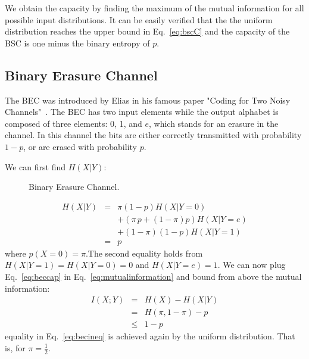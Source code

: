 We obtain the capacity by finding the maximum of the mutual information for all possible input distributions. It can be easily verified that the the uniform distribution reaches the upper bound in Eq.~\ref{eq:bscC} and the capacity of the {BSC} is one minus the binary entropy of $p$.

\subsection{Binary Erasure Channel}
The {BEC} was introduced by Elias in his famous paper "Coding for Two Noisy Channels"~\cite{Elias_55}. The {BEC} has two input elements while the output alphabet is composed of three elements: 0, 1, and $e$, which stands for an erasure in the channel. In this channel the bits are either correctly transmitted with probability $1-p$, or are erased with probability $p$. 

We can first find $H(X|Y) $: 

\begin{figure}[h]
\begin{center}
\def\svgwidth{\columnwidth} 
 
\caption{Binary Erasure Channel.}
\label{fig:bec}
\end{center}
\end{figure}


\begin{eqnarray}
\label{eq:beccap}
H(X|Y) &=& \pi (1-p )H(X|Y=0) \nonumber\\
           && + \left( \pi\, p +(1-\pi)p\right) H(X|Y=e)\nonumber\\
           && + (1-\pi)(1-p)H(X|Y=1) \\
           &=& p
\end{eqnarray}
\noindent where $p(X=0)=\pi$.The second equality holds from $H(X|Y=1)=H(X|Y=0)=0$ and $H(X|Y=e)=1$. We can now plug Eq.~\ref{eq:beccap} in Eq.~\ref{eq:mutualinformation} and bound from above the mutual information:
\begin{eqnarray}
I(X;Y) &=& H(X) - H(X|Y) \\
         &=& H(\pi, 1-\pi) - p\\
         & \leq & 1 - p\label{eq:becineq}
\end{eqnarray}
\noindent equality in Eq.~\ref{eq:becineq} is achieved again by the uniform distribution. That is, for $\pi=\frac{1}{2}$.

